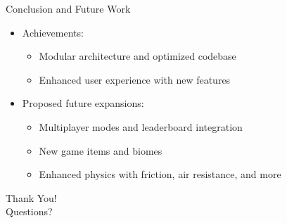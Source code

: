 \documentclass{beamer}
\begin{document}
\begin{frame}{Conclusion and Future Work}
    \begin{itemize}
        \item Achievements:
        \begin{itemize}
            \item Modular architecture and optimized codebase
            \item Enhanced user experience with new features
        \end{itemize}
        \item Proposed future expansions:
        \begin{itemize}
            \item Multiplayer modes and leaderboard integration
            \item New game items and biomes
            \item Enhanced physics with friction, air resistance, and more
        \end{itemize}
    \end{itemize}
\end{frame}

\begin{frame}
    \centering
    \Huge Thank You! \\
    \vspace{1cm}
    \Large Questions?
\end{frame}
\end{document}
